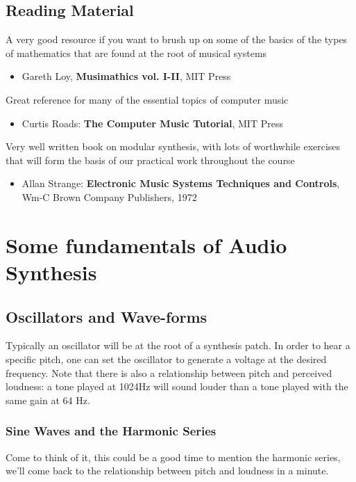\documentclass[11pt]{article}
\begin{document}
\subsection{Reading Material}
\label{sec:org0bc13e1}

A very good resource if you want to brush up on some of the basics of the types of mathematics that are found at the root of musical systems
\begin{itemize}
\item Gareth Loy, \textbf{Musimathics vol. I-II}, MIT Press
\end{itemize}

Great reference for many of the essential topics of computer music
\begin{itemize}
\item Curtis Roads: \textbf{The Computer Music Tutorial}, MIT Press
\end{itemize}

Very well written book on modular synthesis, with lots of worthwhile exercises that will form the basis of our practical work throughout the course
\begin{itemize}
\item Allan Strange: \textbf{Electronic Music Systems Techniques and Controls}, Wm-C Brown Company Publishers, 1972
\end{itemize}


\section{Some fundamentals of Audio Synthesis}
\label{sec:orge00553d}
\subsection{Oscillators and Wave-forms}
\label{sec:org484e0a8}
Typically an oscillator will be at the root of a synthesis patch. 
In order to hear a specific pitch, one can set the oscillator to 
generate a voltage at the desired frequency.  
Note that there is also a relationship between pitch and perceived 
loudness: a tone played at 1024Hz will sound louder than a tone played with the same gain at 64 Hz.

\subsubsection{Sine Waves and the Harmonic Series}
\label{sec:orgffbc3b8}
Come to think of it, this could be a good time to mention the harmonic
series, we'll come back to the relationship between pitch and loudness
in a minute. 
\end{document}
